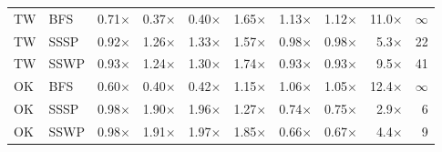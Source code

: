 \begin{table}[t]
\begin{tabular}{llrrrrrrrr}
    \midrule
    TW & BFS & 0.71$\times$ & 0.37$\times$ & 0.40$\times$ & 1.65$\times$ & 1.13$\times$ & 1.12$\times$ & 11.0$\times$ & $\infty$ \\
    TW & SSSP & 0.92$\times$ & 1.26$\times$ & 1.33$\times$ & 1.57$\times$ & 0.98$\times$ & 0.98$\times$ & 5.3$\times$ & 22 \\
    TW & SSWP & 0.93$\times$ & 1.24$\times$ & 1.30$\times$ & 1.74$\times$ & 0.93$\times$ & 0.93$\times$ & 9.5$\times$ & 41 \\
    \midrule
    OK & BFS & 0.60$\times$ & 0.40$\times$ & 0.42$\times$ & 1.15$\times$ & 1.06$\times$ & 1.05$\times$ & 12.4$\times$ & $\infty$ \\
    OK & SSSP & 0.98$\times$ & 1.90$\times$ & 1.96$\times$ & 1.27$\times$ & 0.74$\times$ & 0.75$\times$ & 2.9$\times$ & 6 \\
    OK & SSWP & 0.98$\times$ & 1.91$\times$ & 1.97$\times$ & 1.85$\times$ & 0.66$\times$ & 0.67$\times$ & 4.4$\times$ & 9 \\
    \bottomrule
  \end{tabular}
\end{table}


